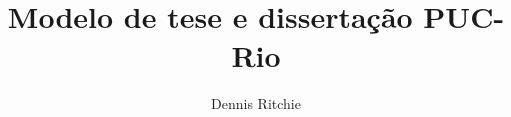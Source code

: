 \documentclass[phd,american,digital]{thesispuc}%
\author{Dennis Ritchie}
\title{Modelo de tese e dissertação PUC-Rio} %
\begin{document}
  
  
  
  \arial
   
\end{document}
